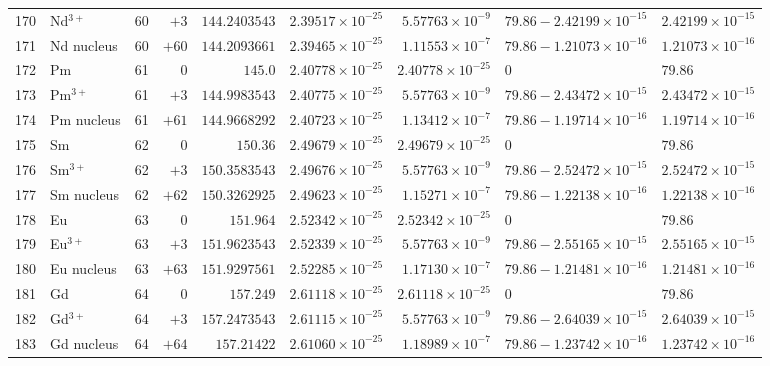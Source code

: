 {\begin{tabular}{@{}r l r r r r r l l@{}}
170 & Nd$^{3+}$ & 60 & $+3$ & $144.2403543$ & $2.39517{\times}10^{-25}$ & $5.57763{\times}10^{-9}$ & $79.86 - 2.42199{\times}10^{-15}$ & $2.42199{\times}10^{-15}$ \\
171 & Nd nucleus & 60 & $+60$ & $144.2093661$ & $2.39465{\times}10^{-25}$ & $1.11553{\times}10^{-7}$ & $79.86 - 1.21073{\times}10^{-16}$ & $1.21073{\times}10^{-16}$ \\
172 & Pm & 61 & $0$ & $145.0$ & $2.40778{\times}10^{-25}$ & $2.40778{\times}10^{-25}$ & $0$ & $79.86$ \\
173 & Pm$^{3+}$ & 61 & $+3$ & $144.9983543$ & $2.40775{\times}10^{-25}$ & $5.57763{\times}10^{-9}$ & $79.86 - 2.43472{\times}10^{-15}$ & $2.43472{\times}10^{-15}$ \\
174 & Pm nucleus & 61 & $+61$ & $144.9668292$ & $2.40723{\times}10^{-25}$ & $1.13412{\times}10^{-7}$ & $79.86 - 1.19714{\times}10^{-16}$ & $1.19714{\times}10^{-16}$ \\
175 & Sm & 62 & $0$ & $150.36$ & $2.49679{\times}10^{-25}$ & $2.49679{\times}10^{-25}$ & $0$ & $79.86$ \\
176 & Sm$^{3+}$ & 62 & $+3$ & $150.3583543$ & $2.49676{\times}10^{-25}$ & $5.57763{\times}10^{-9}$ & $79.86 - 2.52472{\times}10^{-15}$ & $2.52472{\times}10^{-15}$ \\
177 & Sm nucleus & 62 & $+62$ & $150.3262925$ & $2.49623{\times}10^{-25}$ & $1.15271{\times}10^{-7}$ & $79.86 - 1.22138{\times}10^{-16}$ & $1.22138{\times}10^{-16}$ \\
178 & Eu & 63 & $0$ & $151.964$ & $2.52342{\times}10^{-25}$ & $2.52342{\times}10^{-25}$ & $0$ & $79.86$ \\
179 & Eu$^{3+}$ & 63 & $+3$ & $151.9623543$ & $2.52339{\times}10^{-25}$ & $5.57763{\times}10^{-9}$ & $79.86 - 2.55165{\times}10^{-15}$ & $2.55165{\times}10^{-15}$ \\
180 & Eu nucleus & 63 & $+63$ & $151.9297561$ & $2.52285{\times}10^{-25}$ & $1.17130{\times}10^{-7}$ & $79.86 - 1.21481{\times}10^{-16}$ & $1.21481{\times}10^{-16}$ \\
181 & Gd & 64 & $0$ & $157.249$ & $2.61118{\times}10^{-25}$ & $2.61118{\times}10^{-25}$ & $0$ & $79.86$ \\
182 & Gd$^{3+}$ & 64 & $+3$ & $157.2473543$ & $2.61115{\times}10^{-25}$ & $5.57763{\times}10^{-9}$ & $79.86 - 2.64039{\times}10^{-15}$ & $2.64039{\times}10^{-15}$ \\
183 & Gd nucleus & 64 & $+64$ & $157.21422$ & $2.61060{\times}10^{-25}$ & $1.18989{\times}10^{-7}$ & $79.86 - 1.23742{\times}10^{-16}$ & $1.23742{\times}10^{-16}$ \\

\end{tabular}}
